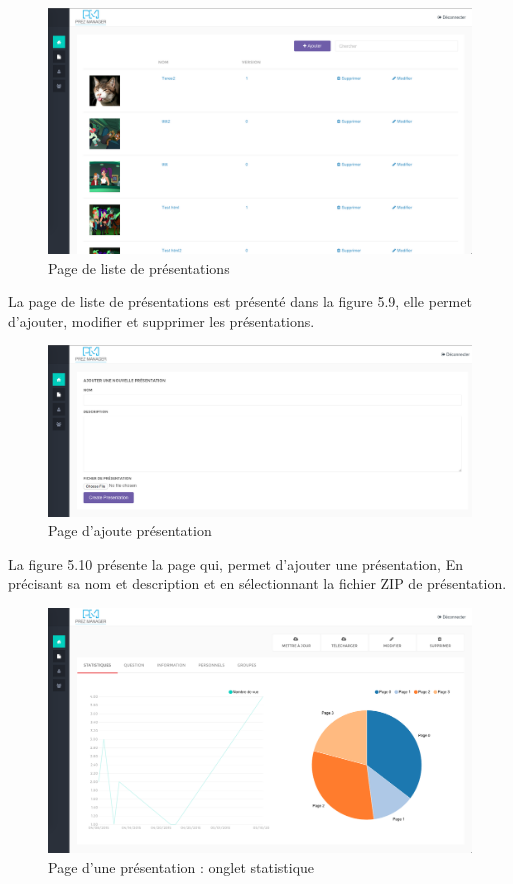 \documentclass[12pt, ChapStyle1, oneside]{./Styles/Dea_Gsm}
\begin{document}
\begin{figure}[H]
    \centering
    \includegraphics[width=6in]{screenshots/web/listepresentation}
    \caption{Page de liste de présentations}
\end{figure}
La page de liste de présentations est présenté dans la figure 5.9, elle permet d'ajouter, modifier et supprimer les présentations. 

\begin{figure}[H]
    \centering
    \includegraphics[width=6in]{screenshots/web/ajoutpresentation}
    \caption{Page d'ajoute présentation}

\end{figure}
La figure 5.10 présente la page qui, permet d'ajouter une présentation, En précisant sa nom et description et en sélectionnant la fichier ZIP de présentation.
\begin{figure}[H]
    \centering
    \includegraphics[width=6in]{screenshots/web/statistiquepresentation}
    \caption{Page d'une présentation : onglet statistique}

\end{figure}
\end{document}
